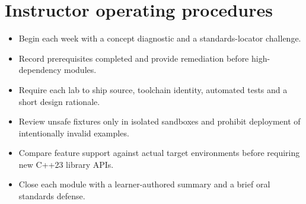 \documentclass[11pt]{article}
\begin{document}
\section{Instructor operating procedures}
\begin{itemize}[leftmargin=*,itemsep=1pt,topsep=3pt]
\item Begin each week with a concept diagnostic and a standards-locator challenge.
\item Record prerequisites completed and provide remediation before high-dependency modules.
\item Require each lab to ship source, toolchain identity, automated tests and a short design rationale.
\item Review unsafe fixtures only in isolated sandboxes and prohibit deployment of intentionally invalid examples.
\item Compare feature support against actual target environments before requiring new C++23 library APIs.
\item Close each module with a learner-authored summary and a brief oral standards defense.
\end{itemize}
\docend
\end{document}
